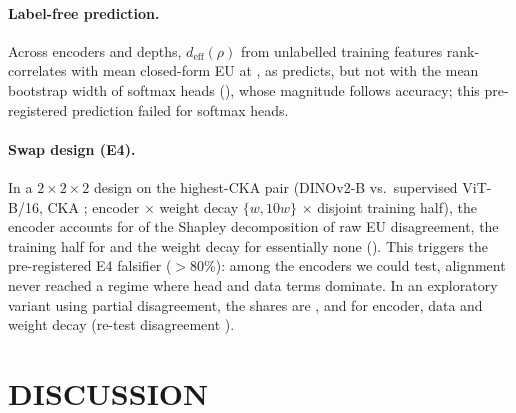 \documentclass[twoside]{article}
\theoremstyle{definition}
\theoremstyle{remark}
\newcommand{\deff}{d_{\mathrm{eff}}}
\begin{document}
\paragraph{Label-free prediction.}
Across encoders and depths, $\deff(\rho)$ from unlabelled training features rank-correlates with mean closed-form EU at \DeffVsBLR{}, as  predicts, but not with the mean bootstrap width of softmax heads (\DeffVsWidth{}), whose magnitude follows accuracy; this pre-registered prediction failed for softmax heads.

\paragraph{Swap design (E4).}
In a $2\times2\times2$ design on the highest-CKA pair (DINOv2-B vs.\ supervised ViT-B/16, CKA \EfourCKA{}; encoder $\times$ weight decay $\{w,10w\}$ $\times$ disjoint training half), the encoder accounts for \EfourRep{} of the Shapley decomposition of raw EU disagreement, the training half for \EfourData{} and the weight decay for essentially none (\EfourHead{}).
This triggers the pre-registered E4 falsifier ($>80\%$): among the encoders we could test, alignment never reached a regime where head and data terms dominate.
In an exploratory variant using partial disagreement, the shares are \EfourPRep{}, \EfourPData{} and \EfourPHead{} for encoder, data and weight decay (re-test disagreement \EfourPFloor{}).



\section{DISCUSSION}
\label{sec:disc}
\end{document}
